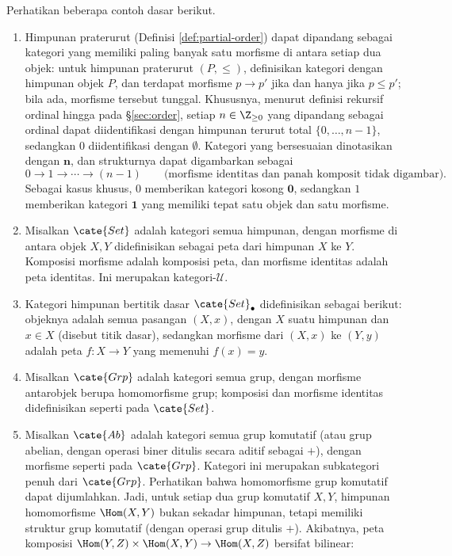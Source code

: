 \begin{example}\label{eg:categories}
	Perhatikan beberapa contoh dasar berikut.
	\begin{enumerate}
		\item Himpunan praterurut (Definisi \ref{def:partial-order}) dapat dipandang sebagai kategori yang memiliki paling banyak satu morfisme di antara setiap dua objek: untuk himpunan praterurut $(P, \leq)$, definisikan kategori dengan himpunan objek $P$, dan terdapat morfisme $p \to p'$ jika dan hanya jika $p \leq p'$; bila ada, morfisme tersebut tunggal. Khususnya, menurut definisi rekursif ordinal hingga pada \S\ref{sec:order}, setiap $n \in \Z_{\geq 0}$ yang dipandang sebagai ordinal dapat diidentifikasi dengan himpunan terurut total $\{0, \ldots, n-1\}$, sedangkan $0$ diidentifikasi dengan $\emptyset$. Kategori yang bersesuaian dinotasikan dengan $\mathbf{n}$, dan strukturnya dapat digambarkan sebagai
		{\small \[ 0 \to 1 \to \cdots \to (n-1) \qquad \text{(morfisme identitas dan panah komposit tidak digambar)}. \] }
		Sebagai kasus khusus, $0$ memberikan kategori kosong $\mathbf{0}$, sedangkan $1$ memberikan kategori $\mathbf{1}$ yang memiliki tepat satu objek dan satu morfisme. 
		\item Misalkan $\cate{Set}$ adalah kategori semua himpunan, dengan morfisme di antara objek $X,Y$ didefinisikan sebagai peta dari himpunan $X$ ke $Y$. Komposisi morfisme adalah komposisi peta, dan morfisme identitas adalah peta identitas. Ini merupakan kategori-$\mathcal{U}$.
		\item Kategori himpunan bertitik dasar $\cate{Set}_\bullet$ didefinisikan sebagai berikut: objeknya adalah semua pasangan $(X,x)$, dengan $X$ suatu himpunan dan $x \in X$ (disebut titik dasar), sedangkan morfisme dari $(X,x)$ ke $(Y,y)$ adalah peta $f: X \to Y$ yang memenuhi $f(x)=y$. 
		\item Misalkan $\cate{Grp}$ adalah kategori semua grup, dengan morfisme antarobjek berupa homomorfisme grup; komposisi dan morfisme identitas didefinisikan seperti pada $\cate{Set}$.
		\item Misalkan $\cate{Ab}$ adalah kategori semua grup komutatif (atau grup abelian, dengan operasi biner ditulis secara aditif sebagai $+$), dengan morfisme seperti pada $\cate{Grp}$. Kategori ini merupakan subkategori penuh dari $\cate{Grp}$. Perhatikan bahwa homomorfisme grup komutatif dapat dijumlahkan. Jadi, untuk setiap dua grup komutatif $X,Y$, himpunan homomorfisme $\Hom(X,Y)$ bukan sekadar himpunan, tetapi memiliki struktur grup komutatif (dengan operasi grup ditulis $+$). Akibatnya, peta komposisi $\Hom(Y, Z) \times \Hom(X, Y) \to \Hom(X, Z)$ bersifat bilinear:

\end{enumerate}
\end{example}
